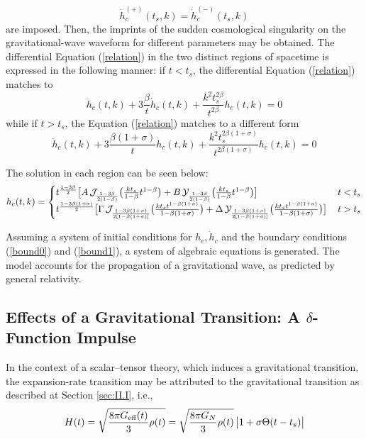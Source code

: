 \documentclass[universe,article,accept,moreauthors,pdftex]{Definitions/mdpi}
\begin{document}
\begin{equation}\label{bound1}
\dot{h}^{(+)}_{c}(t_{s},k)=\dot{h}^{(-)}_{c}(t_{s},k)
\end{equation}
are imposed. Then, the imprints of the sudden cosmological singularity on the gravitational-wave waveform for different parameters may be obtained. The differential Equation (\ref{relation}) in the two distinct regions of spacetime is expressed in the following manner: if $t<t_{s}$, the differential Equation (\ref{relation}) matches to
\begin{equation}
    \ddot{h}_{c}(t,k) + 3 \frac{\beta}{t}\dot{h}_{c}(t,k) + \frac{k^{2}t_{s}^{2\beta}}{t^{2\beta}}h_{c}(t,k) = 0
\end{equation}
while if $t>t_{s}$, the Equation (\ref{relation}) matches to a different form
\begin{equation}
\ddot{h}_{c}(t,k) + 3 \frac{\beta(1+\sigma)}{t}\dot{h}_{c}(t,k) + \frac{k^{2}t_{s}^{2\beta(1+\sigma)}}{t^{2\beta(1+\sigma)}}h_{c}(t,k) = 0
\end{equation}

The solution in each region can be seen below:
\begin{equation}\label{sol1}
h_{c}(t,k)=
\begin{cases}
    t^{\frac{1-3\beta}{2}}\big{[}A \,\mathcal{J}_{\frac{1-3\beta}{2(1-\beta)}}\big{(}\frac{kt_{s}}{1-\beta}t^{1-\beta}\big{)}+B\, \mathcal{Y}_{\frac{1-3\beta}{2(1-\beta)}}\big{(}\frac{kt_{s}}{1-\beta}t^{1-\beta}\big{)}\big{]}&\, t<t_{s}\\

    t^{\frac{1-3\beta(1+\sigma)}{2}}\big{[}\Gamma\, \mathcal{J}_{\frac{1-3\beta(1+\sigma)}{2[1-\beta(1+\sigma)]}}\big{(}\frac{kt_{s}t^{1-\beta(1+\sigma)}}{1-\beta(1+\sigma)}\big{)}+\Delta\,  \mathcal{Y}_{\frac{1-3\beta(1+\sigma)}{2[1-\beta(1+\sigma)]}}\big{(}\frac{kt_{s}t^{1-\beta(1+\sigma)}}{1-\beta(1+\sigma)}\big{)}\big{]}&\, t>t_{s}
    \end{cases}
\end{equation}

Assuming a system of initial conditions for $h_{c},\dot{h}_{c}$ and the boundary conditions (\ref{bound0}) and (\ref{bound1}), a system of algebraic equations is generated. The model accounts for the propagation of a gravitational wave, as predicted by general relativity.  

\subsection{Effects of a Gravitational Transition: A $\delta$-Function Impulse}
In the context of a scalar--tensor theory, which induces a gravitational transition, the expansion-rate transition may be attributed to the gravitational transition as described at Section \ref{sec:II.I}, i.e.,
 \begin{equation}
     H(t)=\sqrt{\frac{8\pi G_{\text{eff}}(t)}{3}\rho(t)}=\sqrt{\frac{8\pi G_{N}}{3}\rho(t)}\,\big{|}1+\sigma \Theta(t-t_{s})\big{|}
 \end{equation}
 
\end{document}
